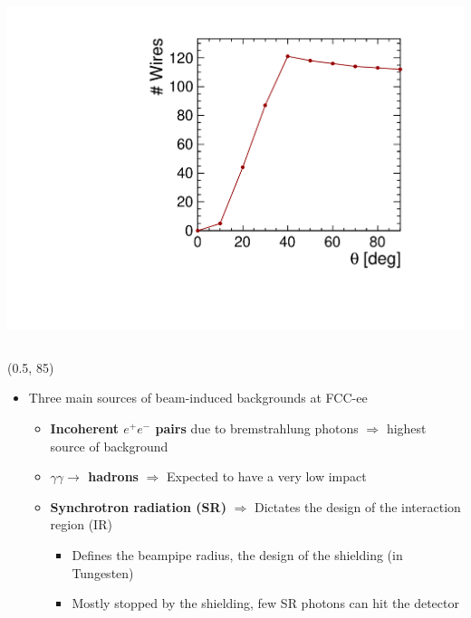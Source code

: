 \documentclass[final,xcolor={dvipsnames,svgnames,x11names,table}]{beamer}
\begin{document}
\begin{frame}
\begin{textblock}{39.5}
\begin{tcolorbox}[title=The simulation of the drift chamber with FCCSW]
\begin{columns}
        \centering
        \includegraphics[width=\textwidth]{Figures/numWires}
    \end{columns}

  \end{tcolorbox}
\end{textblock}



\begin{textblock}{43}(0.5, 85)
  \begin{tcolorbox}[title=Beam-induced backgrounds and the impact on the drift chamber]

  \begin{itemize}
    \item Three main sources of beam-induced backgrounds at FCC-ee \vspace{0.5cm}
    \begin{itemize}
      \item \textbf{Incoherent $e^+e^-$ pairs} due to bremstrahlung photons $\Rightarrow$ highest source of background \vspace{0.2cm}
      \item \textbf{$\gamma\gamma\rightarrow$ hadrons} $\Rightarrow$ Expected to have a very low impact \vspace{0.2cm}
      \item \textbf{Synchrotron radiation (SR)} $\Rightarrow$ Dictates the design of the interaction region (IR) \vspace{0.2cm}
        \begin{itemize}
          \item Defines the beampipe radius, the design of the shielding (in Tungesten)
          \item Mostly stopped by the shielding, few SR photons can hit the detector
        \end{itemize}
    \end{itemize}
  \end{itemize}


\end{tcolorbox}
\end{textblock}
\end{frame}
\end{document}
